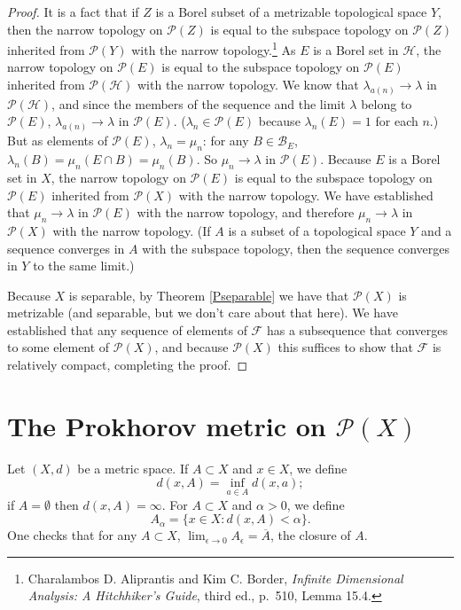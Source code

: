 \documentclass{article}
\theoremstyle{definition}
\begin{document}
\begin{proof}
It is a fact that if $Z$ is a Borel subset of a metrizable topological space $Y$, then the narrow topology
on $\mathscr{P}(Z)$ is equal to the subspace topology on $\mathscr{P}(Z)$ inherited from $\mathscr{P}(Y)$ with the narrow
topology.\footnote{Charalambos D. 
Aliprantis and Kim C. Border, {\em Infinite Dimensional Analysis: A Hitchhiker's Guide}, third ed., p.~510, Lemma 15.4.}
As $E$ is a Borel set in $\mathscr{H}$,  the narrow topology on $\mathscr{P}(E)$ is equal to the subspace
topology on $\mathscr{P}(E)$ inherited from $\mathscr{P}(\mathscr{H})$ with the narrow topology.
We know that $\lambda_{a(n)} \to \lambda$ in $\mathscr{P}(\mathscr{H})$, and since
the members of the sequence and the limit $\lambda$ belong to $\mathscr{P}(E)$, 
$\lambda_{a(n)} \to \lambda$ in 
$\mathscr{P}(E)$. ($\lambda_n \in \mathscr{P}(E)$ because $\lambda_n(E)=1$ for each $n$.)
But as elements of $\mathscr{P}(E)$, $\lambda_n = \mu_n$: for any $B \in \mathscr{B}_E$, $\lambda_n(B) = \mu_n(E \cap B)= \mu_n(B)$. 
So $\mu_n \to \lambda$ in $\mathscr{P}(E)$. 
Because $E$ is a Borel set in $X$, the narrow topology on $\mathscr{P}(E)$ is equal to the subspace topology on
$\mathscr{P}(E)$ inherited from $\mathscr{P}(X)$ with the narrow topology. We have established
 that $\mu_n \to \lambda$ in $\mathscr{P}(E)$ with the narrow
topology, and therefore $\mu_n \to \lambda$ in $\mathscr{P}(X)$ with the narrow topology. (If $A$ is a subset of a topological space $Y$ and
a sequence converges in $A$ with the subspace topology, then the sequence converges in $Y$ to the same limit.)

Because $X$ is separable, by Theorem \ref{Pseparable} we have that $\mathscr{P}(X)$ is metrizable (and separable, but we don't care about that here).
We have established that any sequence of elements of $\mathscr{F}$ has a subsequence that converges to some element of
$\mathscr{P}(X)$, and because $\mathscr{P}(X)$ this suffices to show that $\mathscr{F}$ is relatively compact, completing the proof.
\end{proof}

\section{The Prokhorov metric on $\mathscr{P}(X)$}
Let $(X,d)$ be a metric space. If $A \subset X$ and $x \in X$, we define
\[
d(x,A) = \inf_{a \in A} d(x,a);
\] 
if $A = \emptyset$ then $d(x,A)=\infty$. 
For $A \subset X$ and $\alpha >0$, we define
\[
A_\alpha = \{x \in X: d(x,A)<\alpha\}.
\]
One checks that for any $A \subset X$, $\lim_{\epsilon \to 0} A_\epsilon = \overline{A}$, the closure of $A$.
\end{document}
